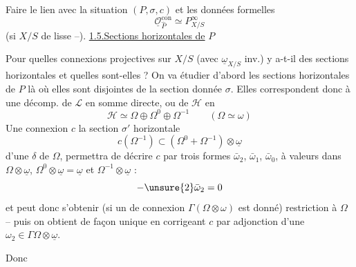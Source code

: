 Faire le lien avec la situation $(P,\sigma,c)$ et les données formelles
\[
\underline{\mathcal{O}}_{\widehat P}^{\mathrm{con}}\simeq P^\infty_{X/S}
\]
(si $X/S$ de  lisse --).
\uline{1.5.}\quad\uline{Sections horizontales de} $P$

Pour quelles connexions projectives sur $X/S$ (avec $\underline{\omega}_{X/S}$ inv.) y a-t-il des sections horizontales  et quelles sont-elles ? On va étudier d'abord les sections horizontales de $P$ là où elles sont disjointes de la section donnée $\sigma$. Elles correspondent donc à une décomp. de $\mathcal{L}$ en somme directe, ou de $\mathcal{H}$ en
\[
\mathcal{H}\simeq\Omega\oplus\Omega^0\oplus\Omega^{-1}\qquad(\Omega\simeq\omega)
\]
 Une connexion $c$  la section $\sigma'$ horizontale  
\[
c(\Omega^{-1})\subset(\Omega^0+\Omega^{-1})\otimes\underline{\omega}
\]
 d'une  $\delta$ de $\Omega$, permettra de décrire $c$ par trois formes $\bar\omega_2$, $\bar\omega_1$, $\bar\omega_0$, à valeurs dans $\Omega\otimes\underline{\omega}$, $\Omega^0\otimes\underline{\omega}=\underline{\omega}$ et $\Omega^{-1}\otimes\underline{\omega}$ :
\[
-\unsure{2}\bar\omega_2=0
\]
 et peut donc s'obtenir (si un  de connexion  $\Gamma(\Omega\otimes\omega)$ est donné)    restriction à $\Omega$ -- puis on obtient de façon unique en corrigeant $c$ par adjonction d'une $\omega_2\in\Gamma\Omega\otimes\underline{\omega}$.

Donc

